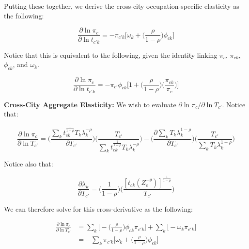 \documentclass[10pt]{article}
\begin{document}
Putting these together, we derive the cross-city occupation-specific elasticity as the following:

\begin{equation*}
    \frac{\partial\ln{\pi_{c}}}{\partial\ln{t_{{c'}k}}} = -{\pi_{{c'}k}}\Big[\omega_{k}+\Big(\frac{\rho}{1-\rho}\Big)\phi_{ck}]
\end{equation*}

Notice that this is equivalent to the following, given the identity linking $\pi_{c}$, $\pi_{ck}$, $\phi_{ck}$, and $\omega_{k}$.

\begin{equation}
    \frac{\partial\ln{\pi_{c}}}{\partial\ln{t_{{c'}k}}} = -{\pi_{c'}}{\phi_{ck}}\Big[1+\Big(\frac{\rho}{1-\rho}\Big)\Big(\frac{\pi_{ck}}{\pi_{c}}\Big)\Big]
\end{equation}

\noindent\textbf{Cross-City Aggregate Elasticity:} We wish to evaluate $\partial\ln{\pi_{c}}/\partial\ln{T_{c'}}$. Notice that:

\begin{equation*}
    \frac{\partial\ln{\pi_{c}}}{\partial\ln{T_{c'}}} = \Bigg(\frac{\sum\limits_{k}{{t^{\frac{1}{1-\rho}}_{ck}}}{T_{k}}{\lambda^{-\rho}_{k}}}{\partial{T_{c'}}}\Bigg)\Bigg(\frac{T_{c'}}{\sum\limits_{k}t^{\frac{1}{1-\rho}}_{ck}{T_{k}}{\lambda^{-\rho}_{k}}}\Bigg) - \Bigg(\frac{\partial\sum\limits_{k}{T_{k}}\lambda^{1-\rho}_{k}}{\partial{T_{c'}}}\Bigg)\Bigg(\frac{T_{c'}}{\sum\limits_{k}{T_{k}}{\lambda_{k}^{1-\rho}}}\Bigg)
\end{equation*}

Notice also that:

\begin{equation*}
    \frac{\partial\lambda_{k}}{\partial{T_{c'}}} = \Bigg(\frac{1}{1-\rho}\Bigg)\Bigg(\frac{[t_{ck}(Z_{c}^{-\theta})]^{\frac{1}{1-\rho}}}{T_{c'}}\Bigg)
\end{equation*}

We can therefore solve for this cross-derivative as the following:

\begin{align*}
    \frac{\partial\ln{\pi_{c}}}{\partial\ln{T_{c'}}} & = \sum\limits_{k}\Big[-\Big(\frac{\rho}{1-\rho}\Big)\phi_{ck}{\pi_{{c'}k}}\Big]+\sum\limits_{k}\Big[-\omega_{k}\pi_{{c'}k}\Big] \\ &= -\sum\limits_{k}{\pi_{{c'}k}}\Big[\omega_{k}+\Big(\frac{\rho}{1-\rho}\Big)\phi_{ck}\Big]
\end{align*}

\end{document}
